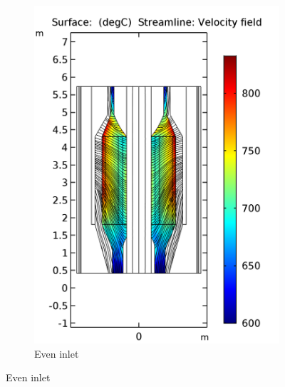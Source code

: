 \documentclass{elsarticle}
\begin{document}
\begin{figure}
\begin{subfigure}[b]{0.42\textwidth}
        \includegraphics[width=\textwidth]{images/diffusion/mk1/SS/flow_opti/T_fuel_even_1.png}
        \caption{Even inlet}
    \end{subfigure}
  

\end{figure}
\end{document}
